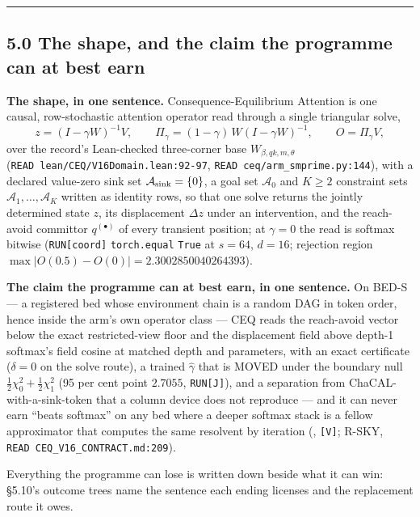 \documentclass[11pt,a4paper]{article}
\theoremstyle{plain}
\theoremstyle{definition}
\theoremstyle{remark}
\begin{document}
\begin{center}\rule{0.5\linewidth}{0.5pt}\end{center}

\subsection{5.0 The shape, and the claim the programme can at best
earn}\label{the-shape-and-the-claim-the-programme-can-at-best-earn}

\textbf{The shape, in one sentence.} Consequence-Equilibrium Attention
is one causal, row-stochastic attention operator read through a single
triangular solve,
\[z=(I-\gamma W)^{-1}V,\qquad \Pi_\gamma=(1-\gamma)\,W(I-\gamma W)^{-1},\qquad O=\Pi_\gamma V,\]
over the record's Lean-checked three-corner base
\(W_{\beta,qk,m,\theta}\) (\texttt{READ\ lean/CEQ/V16Domain.lean:92-97},
\texttt{READ\ ceq/arm\_smprime.py:144}), with a declared value-zero sink
set \(\mathcal{A}_{\rm sink}=\{0\}\), a goal set \(\mathcal{A}_0\) and
\(K\ge 2\) constraint sets \(\mathcal{A}_1,\dots,\mathcal{A}_K\) written
as identity rows, so that one solve returns the jointly determined state
\(z\), its displacement \(\Delta z\) under an intervention, and the
reach-avoid committor \(q^{(\bullet)}\) of every transient position; at
\(\gamma=0\) the read is softmax bitwise (\texttt{RUN{[}coord{]}}
\texttt{torch.equal} \texttt{True} at \(s=64\), \(d=16\); rejection
region \(\max|O(0.5)-O(0)|=2.3002850040264393\)).

\textbf{The claim the programme can at best earn, in one sentence.} On
BED-S --- a registered bed whose environment chain is a random DAG in
token order, hence inside the arm's own operator class --- CEQ reads the
reach-avoid vector below the exact restricted-view floor and the
displacement field above depth-1 softmax's field cosine at matched depth
and parameters, with an exact certificate (\(\delta=0\) on the solve
route), a trained \(\hat\gamma\) that is MOVED under the boundary null
\(\tfrac12\chi^2_0+\tfrac12\chi^2_1\) (95 per cent point \(2.7055\),
\texttt{RUN{[}J{]}}), and a separation from ChaCAL-with-a-sink-token
that a column device does not reproduce --- and it can never earn
``beats softmax'' on any bed where a deeper softmax stack is a fellow
approximator that computes the same resolvent by iteration
(\citep{wang-2024-incontext-td}, \citep{xie-2026-softmax-rl}
\texttt{{[}V{]}}; R-SKY, \texttt{READ\ CEQ\_V16\_CONTRACT.md:209}).

Everything the programme can lose is written down beside what it can
win: §5.10's outcome trees name the sentence each ending licenses and
the replacement route it owes.
\end{document}
